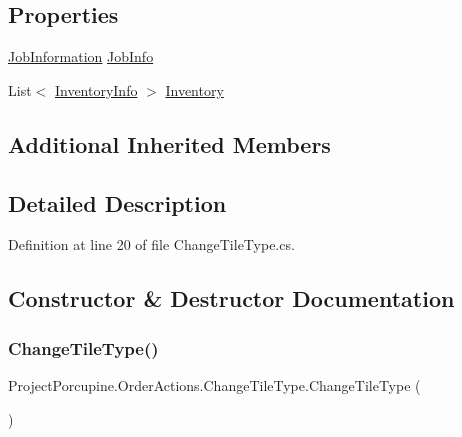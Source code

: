 \subsection*{Properties}
\begin{DoxyCompactItemize}
\item 
\hyperlink{class_project_porcupine_1_1_order_actions_1_1_order_action_1_1_job_information}{Job\+Information} \hyperlink{class_project_porcupine_1_1_order_actions_1_1_change_tile_type_a4bf3c3512f1e94f13171d6f8d609c34c}{Job\+Info}
\item 
List$<$ \hyperlink{class_project_porcupine_1_1_order_actions_1_1_order_action_1_1_inventory_info}{Inventory\+Info} $>$ \hyperlink{class_project_porcupine_1_1_order_actions_1_1_change_tile_type_a94079cf554d1206c68fa853545c05b5a}{Inventory}
\end{DoxyCompactItemize}
\subsection*{Additional Inherited Members}


\subsection{Detailed Description}


Definition at line 20 of file Change\+Tile\+Type.\+cs.



\subsection{Constructor \& Destructor Documentation}
\mbox{\label{class_project_porcupine_1_1_order_actions_1_1_change_tile_type_a063e57330c75d89212d762ca68e7dc03}} 
\subsubsection{\texorpdfstring{Change\+Tile\+Type()}{ChangeTileType()}}
{\footnotesize\ttfamily Project\+Porcupine.\+Order\+Actions.\+Change\+Tile\+Type.\+Change\+Tile\+Type (\begin{DoxyParamCaption}{ }\end{DoxyParamCaption})}



